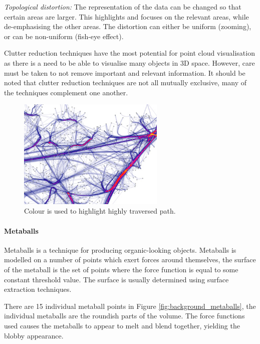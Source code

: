 \emph{Topological distortion:} The representation of the data can be changed so
that certain areas are larger. This highlights and focuses on the relevant
areas, while de-emphasising the other areas. The distortion can either be
uniform (zooming), or can be non-uniform (fish-eye effect).

Clutter reduction techniques have the most potential for point cloud
visualisation as there is a need to be able to visualise many objects in 3D
space. However, care must be taken to not remove important and relevant
information. It should be noted that clutter reduction techniques are not all
mutually exclusive, many of the techniques complement one another.

\begin{figure}
  \begin{center}
    \includegraphics[width=70mm]{graph_highlight}
  \end{center}
  \caption{Colour is used to highlight highly traversed path.}
  \label{fig:background_highlight}
\end{figure}


\paragraph{Metaballs}

Metaballs \citep{blinn82} is a technique for producing organic-looking objects.
Metaballs is modelled on a number of points which exert forces around
themselves, the surface of the metaball is the set of points where the force
function is equal to some constant threshold value. The surface is usually
determined using surface extraction techniques.

There are 15 individual metaball points in Figure
\ref{fig:background_metaballs}, the individual metaballs are the roundish
parts of the volume. The force functions used causes the metaballs to appear to
melt and blend together, yielding the blobby appearance.

